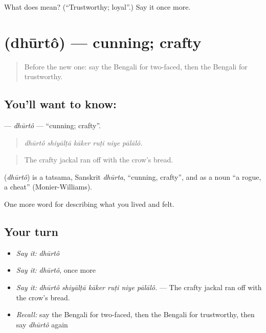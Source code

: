 \begin{tcolorbox}[breakable,colback=teal!4,colframe=teal!35!black,title={Before you move on}]
What does  mean? (\textquotedblleft{}Trustworthy; loyal\textquotedblright{}.) Say it once more.
\end{tcolorbox}
\section[\texorpdfstring{\bn{ধূর্ত} (dhūrtô)}{ধূর্ত (dhūrtô)}]{ (dhūrtô) — cunning; crafty}

\label{lesson:BN-C458-dhurto}



\begin{quote}
Before the new one: say the Bengali for two-faced, then the Bengali for trustworthy.
\end{quote}

\subsection*{You'll want to know: }
\textbf{} — \emph{dhūrtô} — \textquotedblleft{}cunning; crafty\textquotedblright{}.

\begin{quote}
     
\end{quote}

\begin{quote}
\emph{dhūrtô shiyālṭā kāker ruṭi niye pālālô.}
\end{quote}

\begin{quote}
The crafty jackal ran off with the crow's bread.
\end{quote}

\begin{cousinweb}
\textbf{} (\emph{dhūrtô}) is a tatsama, Sanskrit \emph{dhūrta}, \textquotedblleft{}cunning, crafty\textquotedblright{}, and as a noun \textquotedblleft{}a rogue, a cheat\textquotedblright{} (Monier-Williams).
\end{cousinweb}

\begin{grammarlens}[title={What you've built}]
One more word for describing what you lived and felt.
\end{grammarlens}

\subsection*{Your turn}
\begin{itemize}
\raggedright
  \item \emph{Say it:} \emph{dhūrtô}
  \item \emph{Say it:} \emph{dhūrtô}, once more
  \item \emph{Say it:} \emph{dhūrtô shiyālṭā kāker ruṭi niye pālālô.} — The crafty jackal ran off with the crow's bread.
  \item \emph{Recall:} say the Bengali for two-faced, then the Bengali for trustworthy, then say \emph{dhūrtô} again
\end{itemize}

